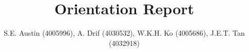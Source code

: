\documentclass[a4paper]{report}
\begin{document}
\title{Orientation Report}
\author{ S.E. Austin (4005996), A. Drif (4030532), W.K.H. Ko (4005686), J.E.T. Tan (4032918)}
\date{}

\maketitle



\end{document}
